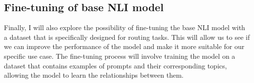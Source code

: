 \subsection{Fine-tuning of base NLI model}
\label{sec:fine_tuning}

Finally, I will also explore the possibility of fine-tuning the base NLI model with a dataset that is specifically designed for routing tasks. This will allow us to see if we can improve the performance of the model and make it more suitable for our specific use case. The fine-tuning process will involve training the model on a dataset that contains examples of prompts and their corresponding topics, allowing the model to learn the relationships between them.





